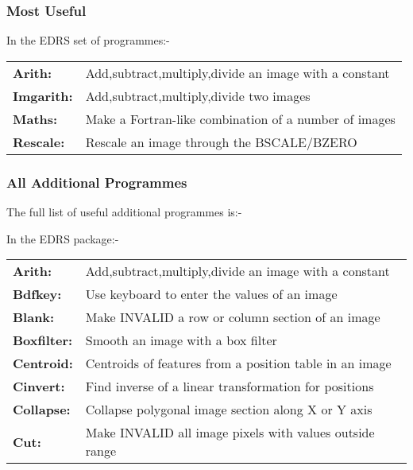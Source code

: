 \subsubsection{Most Useful}

 In the EDRS set of programmes:-

\begin{tabular}{ll}
{\bf  Arith:} &        Add,subtract,multiply,divide an image with a constant \\
{\bf  Imgarith:} &      Add,subtract,multiply,divide two images \\
{\bf  Maths:} &         Make a Fortran-like combination of a number of images \\
{\bf  Rescale:} &       Rescale an image through the BSCALE/BZERO \\
\end{tabular}

\subsubsection{All Additional Programmes}
\label{se:addi}

The full list of useful additional programmes is:-


  In the EDRS package:-

\begin{tabular}{ll}
{\bf  Arith:} &         Add,subtract,multiply,divide an image with a constant \\
{\bf  Bdfkey:} &        Use keyboard to enter the values of an image \\
{\bf  Blank:} &         Make INVALID a row or column section of an image \\
{\bf  Boxfilter:} &     Smooth an image with a box filter \\
{\bf  Centroid:} &      Centroids of features from a position table in an image \\
{\bf  Cinvert:} &       Find inverse of a linear transformation for positions \\
{\bf  Collapse:} &      Collapse polygonal image section along X or Y axis \\
{\bf  Cut:} &           Make INVALID all image pixels with values outside range \\
\end{tabular}

